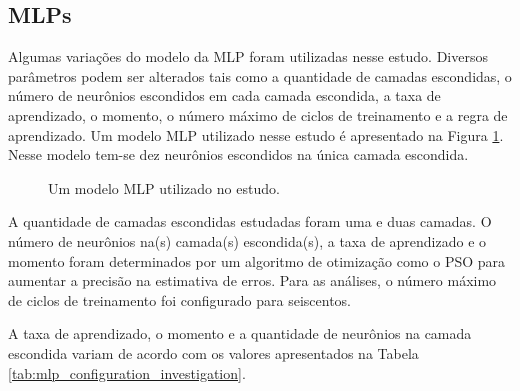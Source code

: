 \subsection{MLPs}

Algumas variações do modelo da MLP foram utilizadas nesse estudo. Diversos parâmetros podem ser alterados tais como a quantidade de camadas escondidas, o número de neurônios escondidos em cada camada escondida, a taxa de aprendizado, o momento, o número máximo de ciclos de treinamento e a regra de aprendizado. Um modelo MLP utilizado nesse estudo é apresentado na Figura \ref{fig:mlp_example}. Nesse modelo tem-se dez neurônios escondidos na única camada escondida.

\begin{figure}[!h]
  \vspace{-0.2cm}
  \centering
  \def \svgwidth{0.55\columnwidth}
  
  \caption{Um modelo MLP utilizado no estudo.}
  \label{fig:mlp_example}
\end{figure} 

A quantidade de camadas escondidas estudadas foram uma e duas camadas. O número de neurônios na(s) camada(s) escondida(s), a taxa de aprendizado e o momento foram determinados por um algoritmo de otimização como o PSO para aumentar a precisão na estimativa de erros. Para as análises, o número máximo de ciclos de treinamento foi configurado para seiscentos.

A taxa de aprendizado, o momento e a quantidade de neurônios na camada escondida variam de acordo com os valores apresentados na Tabela \ref{tab:mlp_configuration_investigation}.

